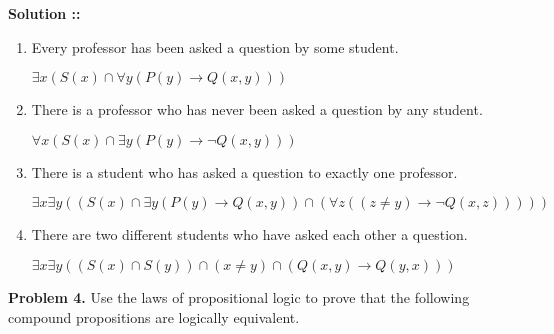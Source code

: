 \documentclass[11pt]{article}
\begin{document}
\vspace{5px}\textbf{Solution ::}
\begin{enumerate}[label=3.\arabic* ::]
\item 
Every professor has been asked a question by some student.

$\exists x(S(x)\cap\forall y(P(y)\rightarrow Q(x,y)))$

\item
There is a professor who has never been asked a question by any student.

$\forall x(S(x)\cap\exists y(P(y)\rightarrow \neg Q(x,y)))$

\item
There is a student who has asked a question to exactly one professor.

$\exists x\exists y((S(x)\cap \exists y(P(y)\rightarrow Q(x, y))\cap 
(\forall z((z\ne y)\rightarrow \neg Q(x,z)))))$

\item 
There are two different students who have asked each other a question.

$\exists x\exists y((S(x)\cap S(y))\cap(x\ne y)\cap(Q(x,y)\rightarrow Q(y,x)))$
\end{enumerate}
\pagebreak


\textbf{Problem 4.} Use the laws of propositional logic to prove that the following
 compound propositions are logically equivalent.
\end{document}
